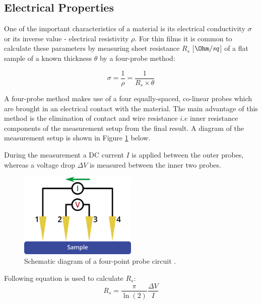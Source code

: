 \subsection{Electrical Properties}

One of the important characteristics of a material is its electrical conductivity $\sigma$ or its inverse value - electrical resistivity $\rho$. For thin films it is common to calculate these parameters by measuring sheet resistance $R_s$ [$\Ohm / sq$]  of a flat sample of a known thickness $\theta$ by a four-probe method: 

\begin{equation}
\sigma = \frac{1}{\rho} = \frac{1}{R_s \times \theta} 
\label{eq:conductivity}
\end{equation}

A four-probe method makes use of a four equally-spaced, co-linear probes which are brought in an electrical contact with the material. The main advantage of this method is the elimination of contact and wire resistance $i.e$ inner resistance components of the measurement setup from the final result. A diagram of the measurement setup is shown in Figure \ref{fig:four-probe} below. 

During the measurement a DC current $I$ is applied between the outer probes, whereas a voltage drop $\Delta V$ is measured between the inner two probes. 

\begin{figure}[H]
\centering
\includegraphics[width=0.5\textwidth]{Figures/Theory/four-point-probe-circuit-schematic.png}
\medskip
\captionsetup{width=0.8\linewidth}
\caption{Schematic diagram of a four-point probe circuit \cite{ossila}.}
\label{fig:four-probe}
\end{figure}

Following equation is used to calculate $R_s$:
\begin{equation}
R_s = \frac{\pi}{\ln (2)}\frac{\Delta V}{I} 
\label{eq:sheet-res}
\end{equation}

